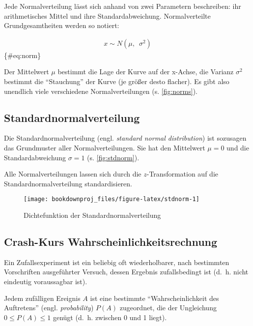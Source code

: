 \documentclass[
  ngerman,
]{article}
\begin{document}
Jede Normalverteilung lässt sich anhand von zwei Parametern beschreiben: ihr arithmetisches Mittel und ihre Standardabweichung. Normalverteilte Grundgesamtheiten werden so notiert:

\nopagebreak

\[\begin{aligned}
x \sim N(\mu,\enspace\sigma^2)
\end{aligned}\]\{\#eq:norm\}

Der Mittelwert \(\mu\) bestimmt die Lage der Kurve auf der x-Achse, die Varianz \(\sigma^2\) bestimmt die ``Stauchung'' der Kurve (je größer desto flacher). Es gibt also unendlich viele verschiedene Normalverteilungen (s. \autoref{fig:norms}).

\hypertarget{standardnormalverteilung}{%
\subsection{Standardnormalverteilung}\label{standardnormalverteilung}}

Die Standardnormalverteilung (engl. \emph{standard normal distribution}) ist sozusagen das Grundmuster aller Normalverteilungen. Sie hat den Mittelwert \(\mu=0\) und die Standardabweichung \(\sigma=1\) (s. \autoref{fig:stdnorm}).

Alle Normalverteilungen lassen sich durch die \(z\)-Transformation auf die Standardnormalverteilung standardisieren.

\begin{figure}[h]

{\centering \texttt{[image: bookdownproj\_files/figure-latex/stdnorm-1]} 

}

\caption{Dichtefunktion der Standardnormalverteilung}\label{fig:stdnorm}
\end{figure}

\hypertarget{crash-kurs-wahrscheinlichkeitsrechnung}{%
\subsection{Crash-Kurs Wahrscheinlichkeitsrechnung}\label{crash-kurs-wahrscheinlichkeitsrechnung}}

Ein Zufallsexperiment ist ein beliebig oft wiederholbarer, nach bestimmten Vorschriften ausgeführter Versuch, dessen Ergebnis zufallsbedingt ist (d.~h. nicht eindeutig voraussagbar ist).

Jedem zufälligen Ereignis \(A\) ist eine bestimmte ``Wahrscheinlichkeit des Auftretens'' (engl. \emph{probability}) \(P(A)\) zugeordnet, die der Ungleichung \(0 \leq P(A) \leq 1\) genügt (d.~h. zwischen 0 und 1 liegt).
\end{document}
